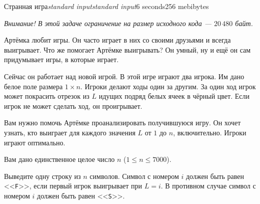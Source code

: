 \begin{problem}{Странная игра}{\textsl{standard input}}{\textsl{standard input}}{6 seconds}{256 mebibytes}{}

\textit{Внимание! В этой задаче ограничение на размер исходного кода --- $20\,480$ байт.}

Артёмка любит игры. Он часто играет в них со своими друзьями и всегда выигрывает. Что же помогает Артёмке выигрывать? Он умный, ну и ещё он сам придумывает игры, в которые играет.

Сейчас он работает над новой игрой. В этой игре играют два игрока. Им дано белое поле размера $1 \times n$. Игроки делают ходы один за другим. За один ход игрок может покрасить отрезок из $L$ идущих подряд белых ячеек в чёрный цвет. Если игрок не может сделать ход, он проигрывает.

Вам нужно помочь Артёмке проанализировать получившуюся игру. Он хочет узнать, кто выиграет для каждого значения $L$ от $1$ до $n$, включительно. Игроки играют оптимально.

\InputFile
Вам дано единственное целое число $n$ ($1 \le n \le 7000$).

\OutputFile
Выведите одну строку из $n$ символов. Символ с номером $i$ должен быть равен <<\texttt{F}>>, если первый игрок выигрывает при $L = i$. В противном случае символ с номером $i$ должен быть равен <<\texttt{S}>>.

\Examples

\begin{example}
%
%
\end{example}

\end{problem}
